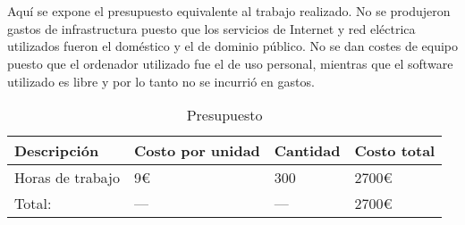 \chapter{\ChapterFive{}}


Aquí se expone el presupuesto equivalente al trabajo realizado. No se produjeron gastos de infrastructura puesto que los servicios de Internet y red eléctrica utilizados fueron el doméstico y el de dominio público. No se dan costes de equipo puesto que el ordenador utilizado fue el de uso personal, mientras que el software utilizado es libre y por lo tanto no se incurrió en gastos.

\begin{table}[!ht]
\centering
\caption{Presupuesto}
\label{tabla-presupuesto}
\begin{tabular}{|l|l|l|l|}
\hline
Descripción      & Costo por unidad & Cantidad & Costo total \\ \hline
Horas de trabajo & 9\euro{}         & 300      & 2700\euro{} \\ \hline
Total:           & ---              & ---      & 2700\euro{} \\ \hline
\end{tabular}
\end{table}